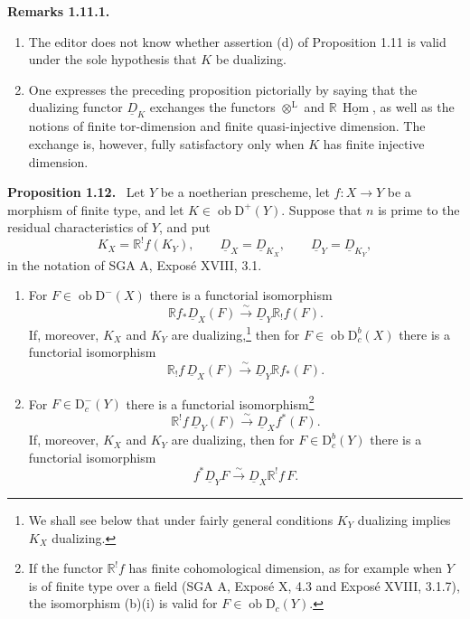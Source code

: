 \documentclass[11pt]{article}
\newenvironment{statement}[1]{\par\medskip\noindent\textbf{#1.}\ }{\par\medskip}
\DeclareMathOperator{\Hom}{Hom}
\newcommand{\D}{\mathrm{D}}
\newcommand{\ob}{\operatorname{ob}}
\providecommand{\Hom}{\operatorname{Hom}}
\providecommand{\ob}{\operatorname{ob}}
\providecommand{\Hom}{\operatorname{Hom}}
\begin{document}
\begin{statement}{Remarks 1.11.1}
\begin{enumerate}[label=\alph*)]
\item The editor does not know whether assertion (d) of Proposition 1.11 is valid under the sole hypothesis that $K$ be dualizing.
\item One expresses the preceding proposition pictorially by saying that the dualizing functor $\underline D_K$ exchanges the functors $\otimes^{\mathrm L}$ and $\mathbb{R}\,\underline{\Hom}$, as well as the notions of finite tor-dimension and finite quasi-injective dimension. The exchange is, however, fully satisfactory only when $K$ has finite injective dimension.
\end{enumerate}
\end{statement}

\begin{statement}{Proposition 1.12}
Let $Y$ be a noetherian prescheme, let $f:X\to Y$ be a morphism of finite type, and let $K\in\ob\D^+(Y)$. Suppose that $n$ is prime to the residual characteristics of $Y$, and put
\[
   K_X=\mathbb{R}^!f(K_Y),\qquad \underline D_X=\underline D_{K_X},\qquad \underline D_Y=\underline D_{K_Y},
\]
in the notation of SGA A, Exposé XVIII, 3.1.
\begin{enumerate}[label=\alph*)]
\item For $F\in\ob\D^-(X)$ there is a functorial isomorphism
\begin{equation}
\mathbb{R} f_*\underline D_X(F)\xrightarrow{\sim}\underline D_Y\mathbb{R}_!f(F).\tag{i}
\end{equation}
If, moreover, $K_X$ and $K_Y$ are dualizing,\footnote{We shall see below that under fairly general conditions $K_Y$ dualizing implies $K_X$ dualizing.} then for $F\in\ob\D_c^b(X)$ there is a functorial isomorphism
\begin{equation}
\mathbb{R}_!f\,\underline D_X(F)\xrightarrow{\sim}\underline D_Y\mathbb{R} f_*(F).\tag{ii}
\end{equation}

\item For $F\in\D_c^-(Y)$ there is a functorial isomorphism\footnote{If the functor $\mathbb{R}^!f$ has finite cohomological dimension, as for example when $Y$ is of finite type over a field (SGA A, Exposé X, 4.3 and Exposé XVIII, 3.1.7), the isomorphism (b)(i) is valid for $F\in\ob\D_c(Y)$.}
\begin{equation}
\mathbb{R}^!f\,\underline D_Y(F)\xrightarrow{\sim}\underline D_X f^*(F).\tag{i}
\end{equation}
If, moreover, $K_X$ and $K_Y$ are dualizing, then for $F\in\D_c^b(Y)$ there is a functorial isomorphism
\begin{equation}
f^*\underline D_YF\xrightarrow{\sim}\underline D_X\mathbb{R}^!f\,F.\tag{ii}
\end{equation}
\end{enumerate}
\end{statement}
\end{document}
